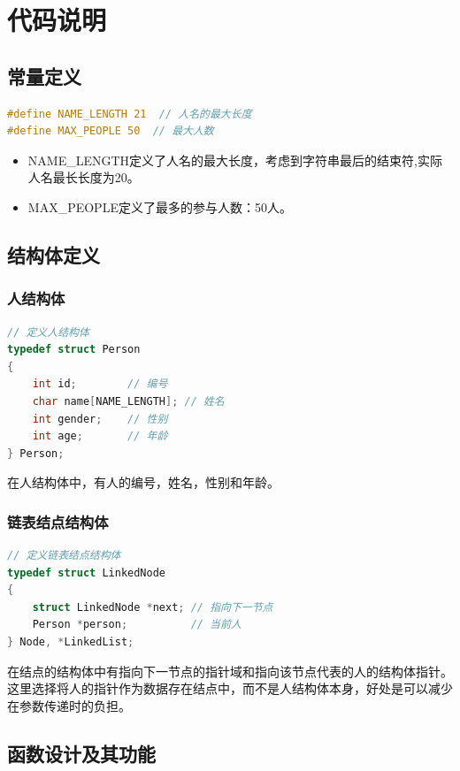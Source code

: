 \documentclass[a4paper,12pt]{report}
\begin{document}
\chapter{代码说明}

\section{常量定义}
\begin{lstlisting}[language=C]
#define NAME_LENGTH 21  // 人名的最大长度
#define MAX_PEOPLE 50  // 最大人数
\end{lstlisting}

\begin{itemize}
    \item NAME\_LENGTH定义了人名的最大长度，考虑到字符串最后的结束符,实际人名最长长度为20。
    \item MAX\_PEOPLE定义了最多的参与人数：50人。
\end{itemize}

\section{结构体定义}
\subsection{人结构体}

\begin{lstlisting}[language=C]
// 定义人结构体
typedef struct Person
{
    int id;        // 编号
    char name[NAME_LENGTH]; // 姓名
    int gender;    // 性别
    int age;       // 年龄
} Person;
\end{lstlisting}
在人结构体中，有人的编号，姓名，性别和年龄。

\subsection{链表结点结构体}
\begin{lstlisting}[language=C]
// 定义链表结点结构体
typedef struct LinkedNode
{
    struct LinkedNode *next; // 指向下一节点
    Person *person;          // 当前人
} Node, *LinkedList;
\end{lstlisting}
在结点的结构体中有指向下一节点的指针域和指向该节点代表的人的结构体指针。这里选择将人的指针作为数据存在结点中，而不是人结构体本身，好处是可以减少在参数传递时的负担。

\section{函数设计及其功能}
	
\end{document}
